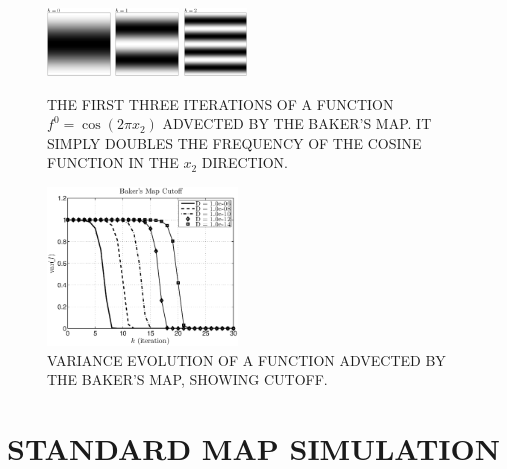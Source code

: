 \documentclass[twocolumn,10pt]{asme2e}
\begin{document}
\begin{figure}
    \includegraphics[width=0.15\textwidth,trim=2.5cm 0cm 2.5cm 0cm,clip]{bakers1}
    \includegraphics[width=0.15\textwidth,trim=2.5cm 0cm 2.5cm 0cm,clip]{bakers2}
    \includegraphics[width=0.15\textwidth,trim=2.5cm 0cm 2.5cm 0cm,clip]{bakers3}
     \caption{\label{bakersmapsimu} THE FIRST THREE ITERATIONS OF A
       FUNCTION $f^0=\cos(2 \pi x_2)$ ADVECTED BY THE BAKER'S MAP. IT
       SIMPLY DOUBLES THE FREQUENCY OF THE COSINE FUNCTION IN THE $x_2$
       DIRECTION.}
\end{figure}



\begin{figure}
    \begin{center}
      \includegraphics[width=0.45\textwidth]{bakersmapcutoff}
    \end{center}
     \caption{\label{bakersmapcutoff} VARIANCE EVOLUTION OF A FUNCTION
       ADVECTED BY THE BAKER'S MAP, SHOWING CUTOFF.}
\end{figure}


\section*{STANDARD MAP SIMULATION}%
\end{document}
